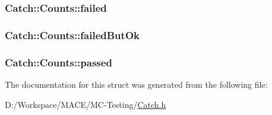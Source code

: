 \subsubsection[{\texorpdfstring{failed}{failed}}]{ Catch\+::\+Counts\+::failed}\hypertarget{struct_catch_1_1_counts_a19982a3817a3bc2c07f0290e71f497a3}{}\label{struct_catch_1_1_counts_a19982a3817a3bc2c07f0290e71f497a3}
\subsubsection[{\texorpdfstring{failed\+But\+Ok}{failedButOk}}]{ Catch\+::\+Counts\+::failed\+But\+Ok}\hypertarget{struct_catch_1_1_counts_ac090973a2ff51394cd452718e75c073e}{}\label{struct_catch_1_1_counts_ac090973a2ff51394cd452718e75c073e}
\subsubsection[{\texorpdfstring{passed}{passed}}]{ Catch\+::\+Counts\+::passed}\hypertarget{struct_catch_1_1_counts_ad28daaf3de28006400208b6dd0c631e6}{}\label{struct_catch_1_1_counts_ad28daaf3de28006400208b6dd0c631e6}


The documentation for this struct was generated from the following file\+:\begin{DoxyCompactItemize}
\item 
D\+:/\+Workspace/\+M\+A\+C\+E/\+M\+C-\/\+Testing/\hyperlink{_catch_8h}{Catch.\+h}\end{DoxyCompactItemize}
